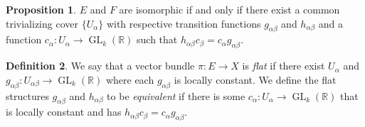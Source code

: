 \documentclass[10pt,letterpaper,cm]{nupset}
\theoremstyle{definition}
\newtheorem{definition}{Definition}[subsection]
\theoremstyle{theorem}
\newtheorem{prop}[definition]{Proposition}
\theoremstyle{remark}
\newcommand{\R}{\mathbb{R}}
\newcommand{\1}{\mathbb{1}}
\newcommand{\0}{\vec 0}
\DeclareMathOperator{\GL}{GL}
\begin{document}
\begin{prop}
$E$ and $F$ are isomorphic if and only if there exist a common trivializing cover $\{U_{\alpha}\}$ with respective transition functions $g_{\alpha{\beta}}$ and $h_{\alpha{\beta}}$ and a function $c_{\alpha} :U_{\alpha} \to \GL_k(\R)$ such that $h_{\alpha{\beta}}c_{\beta} = c_{\alpha}g_{\alpha{\beta}}$.
\end{prop}

\begin{definition}
We say that a vector bundle $\pi : E \to X$ is \textit{flat} if there exist $U_{\alpha}$ and $g_{\alpha{\beta}} : U_{\alpha{\beta}} \to \GL_k(\R)$ where each $g_{\alpha{\beta}}$ is locally constant. We define the flat structures $g_{\alpha{\beta}}$ and $h_{\alpha{\beta}}$ to be \textit{equivalent} if there is some $c_{\alpha} : U_{\alpha} \to \GL_k(\R)$ that is locally constant and has $h_{\alpha{\beta}}c_{\beta} = c_{\alpha}g_{\alpha{\beta}}$.
\end{definition}
\end{document}
